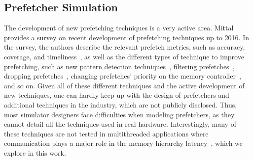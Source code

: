 \documentclass[AMA,final,STIX1COL]{WileyNJD-v2}
\newcommand{\ms}[1]{\textcolor{orange}{\bfseries \ul{ msserpa: #1} }\vspace{0.2cm}}
\newcommand{\fbm}[1]{\textcolor{red}{\bfseries \ul{fbm: #1} }\vspace{0.2cm}}
\begin{document}



\subsection{Prefetcher Simulation}

The development of new prefetching techniques is a very active area.
Mittal~\cite{mittal2016survey} provides a survey on recent development of prefetching techniques up to 2016.
In the survey, the authors describe the relevant prefetch metrics, such as accuracy, coverage, and timeliness~\cite{srinath2007feedback}, as well as the different types of technique to improve prefetching, such as new pattern detection techniques~\cite{nesbit2004data}, filtering prefetches~\cite{zhuang2006reducing}, dropping prefetches~\cite{lee2008prefetcher}, changing prefetches' priority on the memory controller~\cite{ebrahimi2009coordinated}, and so on.
Given all of these different techniques and the active development of new techniques, one can hardly keep up with the design of prefetchers and additional techniques in the industry, which are not publicly disclosed.
Thus, most simulator designers face difficulties when modeling prefetchers, as they cannot detail all the techniques used in real hardware.
Interestingly, many of these techniques are not tested in multithreaded applications where communication plays a major role in the memory hierarchy latency~\cite{jain2018rethinking,wu2019efficient,bhatia2019perceptron}, which we explore in this work.
\end{document}
